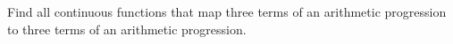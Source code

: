 Find all continuous functions that map three terms of an arithmetic progression to three terms of an arithmetic progression.
